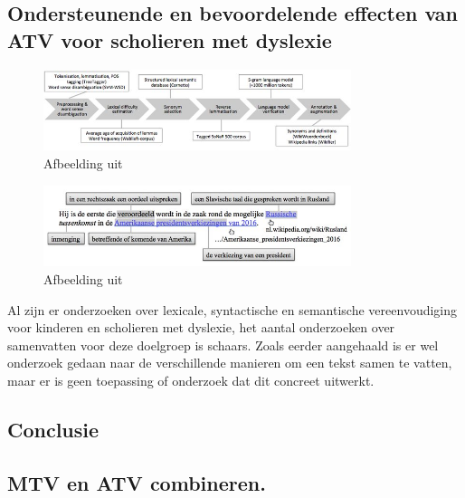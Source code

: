 \subsection{Ondersteunende en bevoordelende effecten van ATV voor scholieren met dyslexie}

\begin{figure}[H]
	\begin{center}
		\includegraphics[width=9cm]{img/dutch-simplification-dyslexia-pipeline.png}
	\end{center}
	\caption{Afbeelding uit \textcite{Bulte2018}}
	\label{img:dyslexia-bulte-pipeline}
\end{figure}

\begin{figure}[H]
	\begin{center}
		\includegraphics[width=9cm]{img/dutch-simplification-dyslexia-example.png}
	\end{center}
	\caption{Afbeelding uit \textcite{Bulte2018}}
	\label{img:dyslexia-bulte-example}
\end{figure}


Al zijn er onderzoeken over lexicale, syntactische en semantische vereenvoudiging voor kinderen en scholieren met dyslexie, het aantal onderzoeken over samenvatten voor deze doelgroep is schaars. Zoals eerder aangehaald is er wel onderzoek gedaan naar de verschillende manieren om een tekst samen te vatten, maar er is geen toepassing of onderzoek dat dit concreet uitwerkt. 

\subsection{Conclusie}



\subsection{MTV en ATV combineren.}

